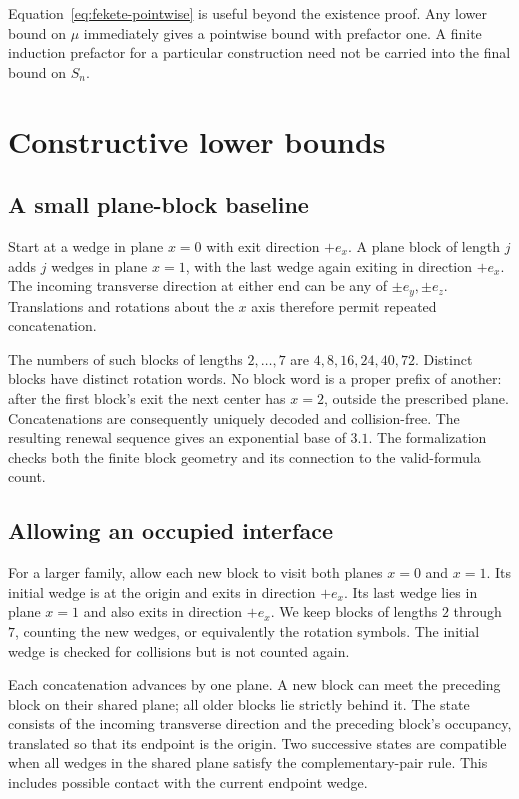 \documentclass[conference]{IEEEtran}
\begin{document}
Equation~\eqref{eq:fekete-pointwise} is useful beyond the existence
proof. Any lower bound on $\mu$ immediately gives a pointwise bound
with prefactor one. A finite induction prefactor for a particular
construction need not be carried into the final bound on $S_n$.

\section{Constructive lower bounds}\label{sec:lower}

\subsection{A small plane-block baseline}

Start at a wedge in plane $x=0$ with exit direction $+e_x$.
A plane block of length $j$ adds $j$ wedges in plane $x=1$,
with the last wedge again exiting in direction $+e_x$.
The incoming transverse direction at either end can be any of
$\pm e_y,\pm e_z$. Translations and rotations about the $x$ axis
therefore permit repeated concatenation.

The numbers of such blocks of lengths $2,\ldots,7$ are
$4,8,16,24,40,72$. Distinct blocks have distinct rotation words.
No block word is a proper prefix of another: after the first block's
exit the next center has $x=2$, outside the prescribed plane.
Concatenations are consequently uniquely decoded and collision-free.
The resulting renewal sequence gives an exponential base of $3.1$.
The formalization checks both the finite block geometry and its
connection to the valid-formula count.

\subsection{Allowing an occupied interface}\label{sec:interface}

For a larger family, allow each new block to visit both planes
$x=0$ and $x=1$. Its initial wedge is at the origin and exits in
direction $+e_x$. Its last wedge lies in plane $x=1$ and also exits
in direction $+e_x$. We keep blocks of lengths $2$ through $7$,
counting the new wedges, or equivalently the rotation symbols.
The initial wedge is checked for collisions but is not counted again.

Each concatenation advances by one plane. A new block can meet
the preceding block on their shared plane; all older blocks lie
strictly behind it. The state consists of the incoming transverse
direction and the preceding block's occupancy, translated so that
its endpoint is the origin. Two successive states are compatible
when all wedges in the shared plane satisfy the complementary-pair
rule. This includes possible contact with the current endpoint wedge.
\end{document}
